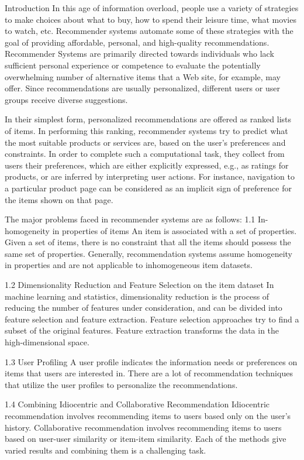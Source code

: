 \documentclass{report}
\begin{document}
\begin{projChapter}{Introduction}
In this age of information overload, people use a variety of strategies to make choices about what to buy, how to spend their leisure time, what movies to watch, etc. Recommender systems automate some of these strategies with the goal of providing affordable, personal, and high-quality recommendations. Recommender Systems are primarily directed towards individuals who lack sufficient personal experience or competence to evaluate the potentially overwhelming number of alternative items that a Web site, for example, may offer. Since recommendations are usually personalized, different users or user groups receive diverse suggestions.

In their simplest form, personalized recommendations are offered as ranked lists of items. In performing this ranking, recommender systems try to predict what the most suitable products or services are, based on the user’s preferences and constraints. In order to complete such a computational task, they collect from users their preferences, which are either explicitly expressed, e.g., as ratings for products, or are inferred by interpreting user actions. For instance, navigation to a particular product page can be considered as an implicit sign of preference for the items shown on that page.

The major problems faced in recommender systems are as follows:
1.1  In-homogeneity in properties of items
An item is associated with a set of properties. Given a set of items, there is no constraint that all the items should possess the same set of properties. Generally, recommendation systems assume homogeneity in properties and are not applicable to inhomogeneous item datasets.

1.2  Dimensionality Reduction and Feature Selection on the item dataset
In machine learning and statistics, dimensionality reduction is the process of reducing the number of features under consideration, and can be divided into feature selection and feature extraction. Feature selection approaches try to find a subset of the original features. Feature extraction transforms the data in the high-dimensional space.

1.3  User Profiling
A user profile indicates the information needs or preferences on items that users are interested in. There are a lot of recommendation techniques that utilize the user profiles to personalize the recommendations.

1.4  Combining Idiocentric and Collaborative Recommendation
Idiocentric recommendation involves recommending items to users based only on the user's history. Collaborative recommendation involves recommending items to users based on user-user similarity or item-item similarity. Each of the methods give varied results and combining them is a challenging task.


\end{projChapter}
\end{document}
